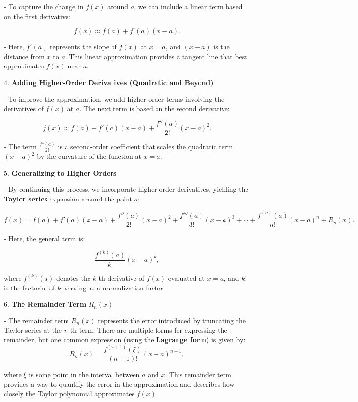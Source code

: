 \documentclass[a4paper,12pt]{book}
\begin{document}
- To capture the change in \( f(x) \) around \( a \), we can include a linear term based on the first derivative:

     \[
     f(x) \approx f(a) + f'(a)(x - a).
     \]
     
- Here, \( f'(a) \) represents the slope of \( f(x) \) at \( x = a \), and \( (x - a) \) is the distance from \( x \) to \( a \). This linear approximation provides a tangent line that best approximates \( f(x) \) near \( a \).

4. \textbf{Adding Higher-Order Derivatives (Quadratic and Beyond)}

- To improve the approximation, we add higher-order terms involving the derivatives of \( f(x) \) at \( a \). The next term is based on the second derivative:
     
     \[
     f(x) \approx f(a) + f'(a)(x - a) + \frac{f''(a)}{2!}(x - a)^2.
     \]
     
- The term \(\frac{f''(a)}{2!}\) is a second-order coefficient that scales the quadratic term \((x - a)^2\) by the curvature of the function at \( x = a \).

5. \textbf{Generalizing to Higher Orders}

- By continuing this process, we incorporate higher-order derivatives, yielding the \textbf{Taylor series} expansion around the point \( a \):
     
     \[
     f(x) = f(a) + f'(a)(x - a) + \frac{f''(a)}{2!}(x - a)^2 + \frac{f'''(a)}{3!}(x - a)^3 + \cdots + \frac{f^{(n)}(a)}{n!}(x - a)^n + R_n(x).
     \]
     
- Here, the general term is:

     \[
     \frac{f^{(k)}(a)}{k!}(x - a)^k,
     \]
     
where \( f^{(k)}(a) \) denotes the \( k \)-th derivative of \( f(x) \) evaluated at \( x = a \), and \( k! \) is the factorial of \( k \), serving as a normalization factor.

6. \textbf{The Remainder Term \( R_n(x) \)}

- The remainder term \( R_n(x) \) represents the error introduced by truncating the Taylor series at the \( n \)-th term. There are multiple forms for expressing the remainder, but one common expression (using the \textbf{Lagrange form}) is given by:
     \[
     R_n(x) = \frac{f^{(n+1)}(\xi)}{(n+1)!}(x - a)^{n+1},
     \]
     
where \( \xi \) is some point in the interval between \( a \) and \( x \). This remainder term provides a way to quantify the error in the approximation and describes how closely the Taylor polynomial approximates \( f(x) \).
\end{document}
